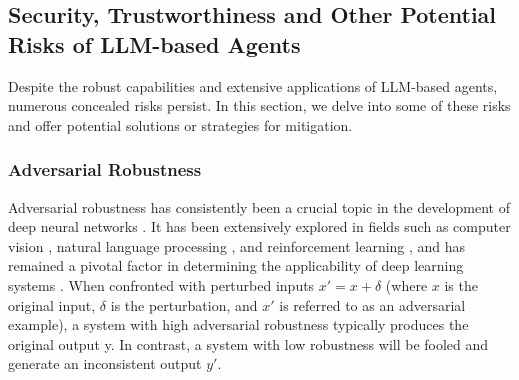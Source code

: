 \subsection{Security, Trustworthiness and Other Potential Risks of LLM-based Agents} \label{sec:Security, Trustworthy And Other Potential Challenges of LLM-based Agents}
Despite the robust capabilities and extensive applications of LLM-based agents, numerous concealed risks persist. In this section, we delve into some of these risks and offer potential solutions or strategies for mitigation.


\subsubsection{Adversarial Robustness}
Adversarial robustness has consistently been a crucial topic in the development of deep neural networks \cite{DBLP:journals/corr/SzegedyZSBEGF13,DBLP:journals/corr/GoodfellowSS14,DBLP:conf/iclr/MadryMSTV18,DBLP:conf/acl/ZhengXLLGZHMSG23,zhiheng2023safety}. 
It has been extensively explored in fields such as computer vision \cite{DBLP:conf/iclr/MadryMSTV18,DBLP:journals/corr/abs-2108-00401,drenkow2021systematic,DBLP:conf/iclr/HendrycksD19}, natural language processing \cite{DBLP:conf/naacl/0002WY22,DBLP:conf/ndss/LiJDLW19,DBLP:conf/iclr/ZhuCGSGL20,DBLP:conf/emnlp/XiZGZH22}, and reinforcement learning \cite{DBLP:conf/icml/PintoDSG17,DBLP:conf/nips/RigterLH22,DBLP:conf/nips/PanagantiXKG22}, and has remained a pivotal factor in determining the applicability of deep learning systems \cite{tencent2019experimental,DBLP:conf/eccv/XuZ0FSCCWL20,DBLP:conf/ccs/SharifBBR16}. When confronted with perturbed inputs $x' = x + \delta$ (where $x$ is the original input, $\delta$ is the perturbation, and $x'$ is referred to as an adversarial example), a system with high adversarial robustness typically produces the original output y. In contrast, a system with low robustness will be fooled and generate an inconsistent output $y'$.

